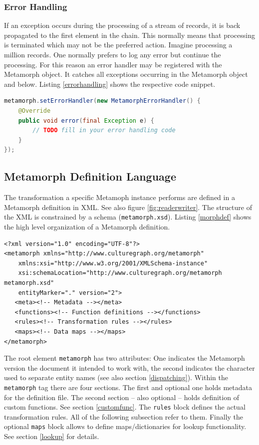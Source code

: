 \documentclass[12pt,a4paper]{article}
\begin{document}
\subsubsection{Error Handling}
If an exception occurs during the processing of a stream of records, it is back propagated to the first element in the chain. This normally means that processing is terminated which may not be the preferred action. Imagine processing a million records. One normally prefers to log any error but continue the processing.
For this reason an error handler may be registered with the Metamorph object. It catches all exceptions occurring in the Metamorph object and below. Listing \ref{errorhandling} shows the respective code snippet.  
\begin{lstlisting}[float=htb, label=errorhandling,caption= Registering an error handler., language=Java]
metamorph.setErrorHandler(new MetamorphErrorHandler() {
	@Override
	public void error(final Exception e) {
		// TODO fill in your error handling code
	}
});
\end{lstlisting}


\subsection{Metamorph Definition Language}\label{def_lang}
The transformation a specific Metamoph instance performs are defined in a Metamorph definition in XML. See also figure \ref{fig:readerwriter}. The structure of the XML is constrained by a schema ({\tt metamorph.xsd}). Listing \ref{morphdef} shows the high level organization of a Metamorph definition.

\begin{lstlisting}[float=htb, label=morphdef,caption=Structure of a Metamorph definition file.]
<?xml version="1.0" encoding="UTF-8"?>
<metamorph xmlns="http://www.culturegraph.org/metamorph"
	xmlns:xsi="http://www.w3.org/2001/XMLSchema-instance"
	xsi:schemaLocation="http://www.culturegraph.org/metamorph metamorph.xsd"
	entityMarker="." version="2">
   <meta><!-- Metadata --></meta>
   <functions><!-- Function definitions --></functions>
   <rules><!-- Transformation rules --></rules>
   <maps><!-- Data maps --></maps>
</metamorph>
\end{lstlisting}
The root element {\tt metamorph} has two attributes: One indicates the Metamorph version the document it intended to work with, the second indicates the character used to separate entity names (see also section \ref{dispatching}). Within the {\tt metamorph} tag there are four sections.
The first and optional one holds metadata for the definition file. The second section -- also optional -- holds definition of custom functions. See section \ref{customfunc}.
The {\tt rules} block defines the actual transformation rules. All of the following subsection refer to them.
Finally the optional {\tt maps} block allows to define maps/dictionaries for lookup functionality. See section \ref{lookup} for details.
\end{document}
